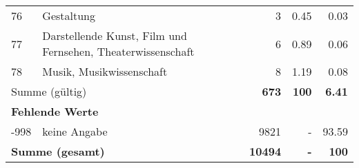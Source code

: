 \begin{longtable}{lXrrr}
        76 & \multicolumn{1}{X}{Gestaltung} & %
          \num{3} &
          \num[round-mode=places,round-precision=2]{0.45} &
          \num[round-mode=places,round-precision=2]{0.03} \\

        77 & \multicolumn{1}{X}{Darstellende Kunst, Film und Fernsehen, Theaterwissenschaft} & %
          \num{6} &
          \num[round-mode=places,round-precision=2]{0.89} &
          \num[round-mode=places,round-precision=2]{0.06} \\

        78 & \multicolumn{1}{X}{Musik, Musikwissenschaft} & %
          \num{8} &
          \num[round-mode=places,round-precision=2]{1.19} &
          \num[round-mode=places,round-precision=2]{0.08} \\

     \midrule
     \multicolumn{2}{l}{Summe (gültig)} &
       \textbf{\num{673}} &
     \textbf{\num{100}} &
       \textbf{\num[round-mode=places,round-precision=2]{6.41}} \\
     \multicolumn{5}{l}{\textbf{Fehlende Werte}}\\
       -998 &
       keine Angabe &
         \num{9821} &
        - &
         \num[round-mode=places,round-precision=2]{93.59} \\
     \midrule
     \multicolumn{2}{l}{\textbf{Summe (gesamt)}} &
          \textbf{\num{10494}} &
        \textbf{-} &
        \textbf{\num{100}} \\
     \bottomrule
     \end{longtable}
     
